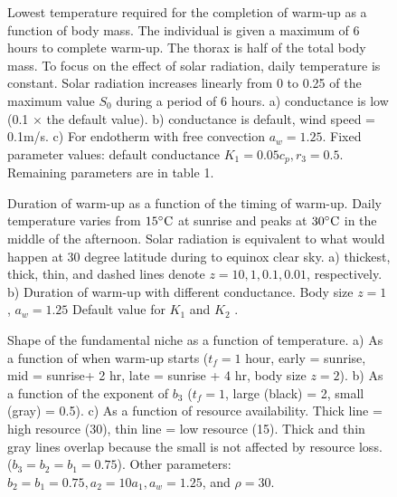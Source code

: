 \vspace{-1.5cm}
%
\begin{figure}[H]
\begin{center}
\caption{
	Lowest temperature required for the completion of warm-up as a function of body mass.
	The individual is given a maximum of 6 hours to complete warm-up.
	The thorax is half of the total body mass.
	To focus on the effect of solar radiation, daily temperature is constant.
	Solar radiation increases linearly from 0 to 0.25 of the maximum value $S_0$ during a period of 6 hours. 
	a) conductance is low (0.1 $\times$ the default value).
	b) conductance is default, wind speed  = 0.1m/s.
	c) For endotherm with free convection $a_w = 1.25$. 
	Fixed parameter values: default conductance $K_1 = 0.05 c_p, r_3 = 0.5$.
	Remaining parameters are in table 1.
}%
\label{fig4}
\end{center}
\end{figure}
\vspace{-1.5cm}
%
\begin{figure}[H]
\begin{center}
\caption{
	Duration of warm-up as a function of the timing of warm-up.
	Daily temperature varies from $15^{\circ}\rm{C}$ at sunrise and peaks at $30^{\circ}\rm{C}$ in the middle of the afternoon.
	Solar radiation is equivalent to what would happen at 30 degree latitude during to equinox clear sky.
	a) thickest, thick, thin, and dashed lines denote  $z = 10, 1, 0.1, 0.01$,  respectively.
	b)  Duration of warm-up with different conductance. Body size $z = 1$ , $a_w = 1.25$
	Default value for $K_1$ and $K_2$ .	
}%
\label{fig5}
\end{center}
\end{figure}
\vspace{-1.5cm}
\begin{figure}[H]
\begin{center}
\caption{
	Shape of the fundamental niche as a function of temperature.
	a) As a function of when warm-up starts ($t_f = 1$ hour, early = sunrise, mid = sunrise+ 2 hr, late = sunrise + 4 hr, body size $z = 2$). 
	b) As a function of the exponent of $b_3$ ($t_f = 1$, large (black) = 2, small (gray) = 0.5).
	c)  As a function of resource availability. 
	Thick line = high resource (30), thin line = low resource (15).
	Thick and thin gray lines overlap because the small is not affected by resource loss. 
	  ($b_3 = b_2 = b_1 = 0.75$).
	Other parameters: $ b_2 = b_1  = 0.75,  a_2 = 10 a_1, a_w = 1.25$, and  $\rho = 30$.
}%
\label{fig6}
\end{center}
\end{figure}
